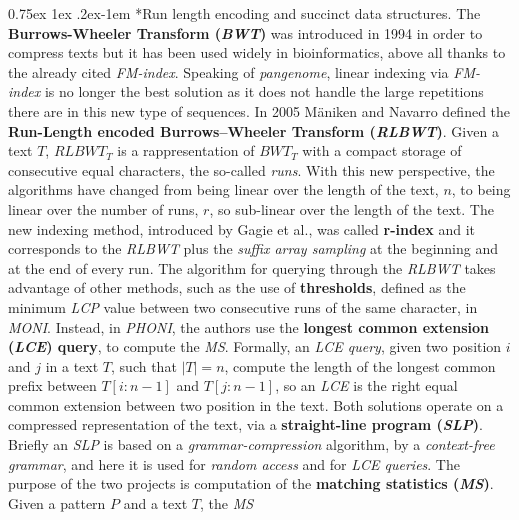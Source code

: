 \documentclass[a4paper,11pt, oneside]{article}
\makeatletter
\newcommand{\pb}[1]{\todo{\textbf{PB} #1}}
\renewcommand{\paragraph}{%
  \@startsection{paragraph}{4}%
  {\z@}{0.75ex \@plus 1ex \@minus .2ex}{-1em}%
  {\normalfont\normalsize\bfseries}%
}
\makeatother
\begin{document}
\paragraph*{Run length encoding and succinct data structures.}
The \textbf{Burrows-Wheeler Transform (\textit{BWT})} was introduced
in 1994 in order to compress texts but it has been used widely
in bioinformatics, above all thanks to the already cited
\textit{FM-index}.
Speaking of \textit{pangenome}, linear indexing via \textit{FM-index} is no
longer the 
best solution as it does not handle the large repetitions there are in this new
type of sequences. In 2005 M\"{a}niken and Navarro defined 
the \textbf{Run-Length encoded Burrows–Wheeler Transform
  (\textit{RLBWT})}. Given a text 
$T$, $RLBWT_T$ is a rappresentation of $BWT_T$ with a compact storage of
consecutive equal characters, the so-called \textit{runs}. With this new
perspective, the algorithms have changed from being linear over the length of
the text, $n$, to being linear over the number of runs, $r$, so sub-linear over
the length of the text. The new indexing method, introduced by Gagie et al., was
called \textbf{r-index} 
and it corresponds to the \textit{RLBWT} plus the \textit{suffix array sampling}
at the beginning and at the end of every run. The algorithm for querying through
the \textit{RLBWT} takes advantage of other methods, such as the use of
\textbf{thresholds}, defined as the minimum \textit{LCP} value between two
consecutive runs of the same character, in \textit{MONI}. Instead, in
\textit{PHONI}, the authors use the \textbf{longest common extension
  (\textit{LCE}) query}, to compute the \textit{MS}. Formally, an \textit{LCE
  query}, given two position $i$ and $j$ in a text $T$, such that $|T|=n$,
compute the length of the longest common prefix between $T[i:n-1]$ and
$T[j:n-1]$, so an \textit{LCE} is the right equal common extension 
between two position in the text. Both solutions operate on a compressed
representation of the text, via a
\textbf{straight-line program (\textit{SLP})}. Briefly an \textit{SLP} is based
on a \textit{grammar-compression} algorithm, by a \textit{context-free grammar},
and here it is used for \textit{random access} and for \textit{LCE queries}. 
The purpose of the two projects is computation of the \textbf{matching
  statistics (\textit{MS})}. Given a pattern $P$ and a text $T$, the \textit{MS}
\end{document}
